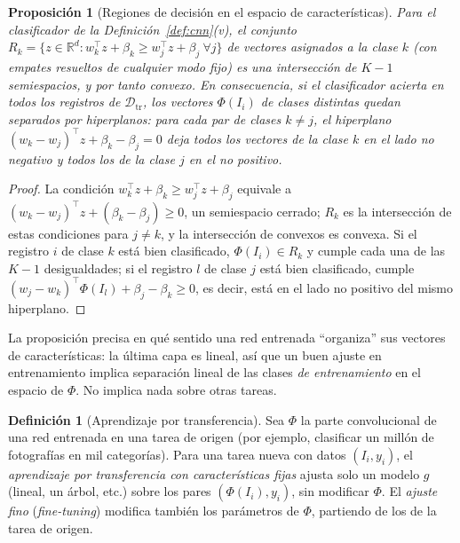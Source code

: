 \documentclass[11pt]{article}
\newtheorem{proposicion}[teorema]{Proposición}
\theoremstyle{definition}
\newtheorem{definicion}[teorema]{Definición}
\theoremstyle{remark}
\newcommand{\R}{\mathbb{R}}
\newcommand{\Dtr}{\mathcal{D}_{\mathrm{tr}}}
\begin{document}
\begin{proposicion}[Regiones de decisión en el espacio de características]\label{prop:regiones}
\noindent Para el clasificador de la Definición~\ref{def:cnn}(v), el conjunto $R_k=\{z\in\R^d:w_k^\top z+\beta_k\ge w_j^\top z+\beta_j\ \forall j\}$ de vectores asignados a la clase $k$ (con empates resueltos de cualquier modo fijo) es una intersección de $K-1$ semiespacios, y por tanto convexo. En consecuencia, si el clasificador acierta en todos los registros de $\Dtr$, los vectores $\Phi(I_i)$ de clases distintas quedan separados por hiperplanos: para cada par de clases $k\ne j$, el hiperplano $(w_k-w_j)^\top z+\beta_k-\beta_j=0$ deja todos los vectores de la clase $k$ en el lado no negativo y todos los de la clase $j$ en el no positivo.
\end{proposicion}
\begin{proof}
\noindent La condición $w_k^\top z+\beta_k\ge w_j^\top z+\beta_j$ equivale a $(w_k-w_j)^\top z+(\beta_k-\beta_j)\ge0$, un semiespacio cerrado; $R_k$ es la intersección de estas condiciones para $j\ne k$, y la intersección de convexos es convexa. Si el registro $i$ de clase $k$ está bien clasificado, $\Phi(I_i)\in R_k$ y cumple cada una de las $K-1$ desigualdades; si el registro $l$ de clase $j$ está bien clasificado, cumple $(w_j-w_k)^\top\Phi(I_l)+\beta_j-\beta_k\ge0$, es decir, está en el lado no positivo del mismo hiperplano.
\end{proof}

\noindent La proposición precisa en qué sentido una red entrenada ``organiza'' sus vectores de características: la última capa es lineal, así que un buen ajuste en entrenamiento implica separación lineal de las clases \emph{de entrenamiento} en el espacio de $\Phi$. No implica nada sobre otras tareas.

\begin{definicion}[Aprendizaje por transferencia]\label{def:transfer}
\noindent Sea $\Phi$ la parte convolucional de una red entrenada en una tarea de origen (por ejemplo, clasificar un millón de fotografías en mil categorías). Para una tarea nueva con datos $(I_i,y_i)$, el \emph{aprendizaje por transferencia con características fijas} ajusta solo un modelo $g$ (lineal, un árbol, etc.) sobre los pares $(\Phi(I_i),y_i)$, sin modificar $\Phi$. El \emph{ajuste fino} (\emph{fine-tuning}) modifica también los parámetros de $\Phi$, partiendo de los de la tarea de origen.
\end{definicion}
\end{document}

